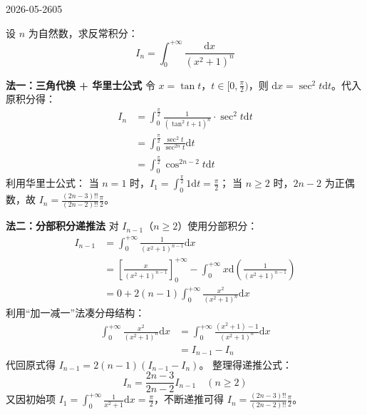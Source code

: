 \begin{mistake}{2026-05-26}{05}

\begin{problemcontent}
设 \(n\) 为自然数，求反常积分：
\[
I_n = \int_0^{+\infty} \frac{\mathrm{d}x}{(x^2+1)^n}
\]
\end{problemcontent}

\begin{solutioncontent}
\textbf{法一：三角代换 + 华里士公式}
令 \(x = \tan t\)，\(t \in [0, \frac{\pi}{2})\)，则 \(\mathrm{d}x = \sec^2 t \mathrm{d}t\)。代入原积分得：
\[
\begin{aligned}
I_n &= \int_0^{\frac{\pi}{2}} \frac{1}{(\tan^2 t + 1)^n} \cdot \sec^2 t \mathrm{d}t \\
    &= \int_0^{\frac{\pi}{2}} \frac{\sec^2 t}{\sec^{2n} t} \mathrm{d}t \\
    &= \int_0^{\frac{\pi}{2}} \cos^{2n-2} t \mathrm{d}t
\end{aligned}
\]
利用华里士公式：
当 \(n=1\) 时，\(I_1 = \int_0^{\frac{\pi}{2}} 1 \mathrm{d}t = \frac{\pi}{2}\)；
当 \(n \ge 2\) 时，\(2n-2\) 为正偶数，故 \(I_n = \frac{(2n-3)!!}{(2n-2)!!}\frac{\pi}{2}\)。

\textbf{法二：分部积分递推法}
对 \(I_{n-1}\)（\(n \ge 2\)）使用分部积分：
\[
\begin{aligned}
I_{n-1} &= \int_0^{+\infty} \frac{1}{(x^2+1)^{n-1}} \mathrm{d}x \\
&= \left[ \frac{x}{(x^2+1)^{n-1}} \right]_0^{+\infty} - \int_0^{+\infty} x \mathrm{d}\left( \frac{1}{(x^2+1)^{n-1}} \right) \\
&= 0 + 2(n-1) \int_0^{+\infty} \frac{x^2}{(x^2+1)^n} \mathrm{d}x
\end{aligned}
\]
利用“加一减一”法凑分母结构：
\[
\begin{aligned}
\int_0^{+\infty} \frac{x^2}{(x^2+1)^n} \mathrm{d}x &= \int_0^{+\infty} \frac{(x^2+1)-1}{(x^2+1)^n} \mathrm{d}x \\
&= I_{n-1} - I_n
\end{aligned}
\]
代回原式得 \(I_{n-1} = 2(n-1)(I_{n-1} - I_n)\)。
整理得递推公式：
\[
I_n = \frac{2n-3}{2n-2} I_{n-1} \quad (n \ge 2)
\]
又因初始项 \(I_1 = \int_0^{+\infty} \frac{1}{x^2+1} \mathrm{d}x = \frac{\pi}{2}\)，不断递推可得 \(I_n = \frac{(2n-3)!!}{(2n-2)!!}\frac{\pi}{2}\)。
\end{solutioncontent}


\end{mistake}
